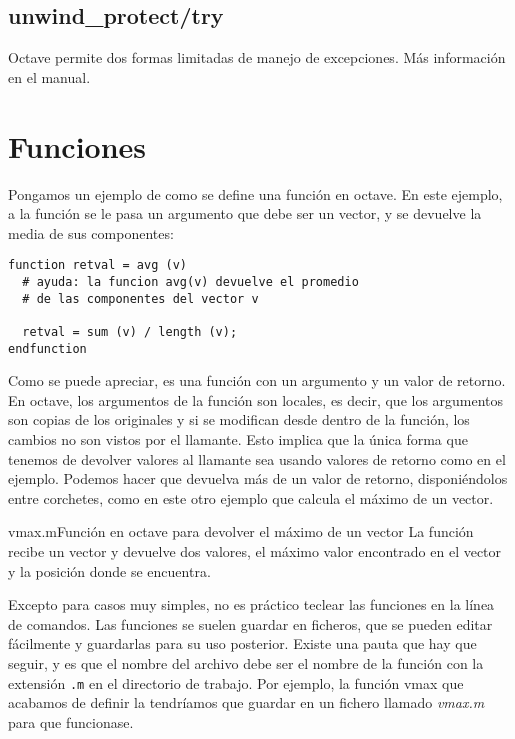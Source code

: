 \subsection{unwind\_protect/try}

Octave  permite  dos formas limitadas de  manejo de  excepciones.  Más
información en el manual.

\section{Funciones}
Pongamos un ejemplo  de como se define una función  en octave. En este
ejemplo, a la función se le pasa  un argumento que debe ser un vector,
y se devuelve la media de sus componentes:

\begin{verbatim}
function retval = avg (v)
  # ayuda: la funcion avg(v) devuelve el promedio
  # de las componentes del vector v

  retval = sum (v) / length (v);
endfunction
\end{verbatim}

Como se puede apreciar, es una función  con un argumento y un valor de
retorno.  En octave,  los argumentos  de  la función  son locales,  es
decir,  que los  argumentos  son  copias de  los  originales  y si  se
modifican desde dentro de la función, los cambios no son vistos por el
llamante.  Esto implica  que la  única forma  que tenemos  de devolver
valores al llamante sea usando valores  de retorno como en el ejemplo.
Podemos hacer que devuelva más  de un valor de retorno, disponiéndolos
entre corchetes, como en este otro ejemplo que calcula el máximo de un
vector.

\begin{ejemplo}{vmax.m}{Función en  octave para devolver el  máximo de
un vector}  La función  recibe un  vector y  devuelve dos  valores, el
máximo valor encontrado en el vector y la posición donde se encuentra.
\end{ejemplo}

Excepto para casos  muy simples, no es práctico  teclear las funciones
en la línea de comandos. Las  funciones se suelen guardar en ficheros,
que se  pueden editar fácilmente  y guardarlas para su  uso posterior.
Existe una pauta  que hay que seguir,  y es que el  nombre del archivo
debe ser  el nombre  de la  función con la  extensión \verb|.m|  en el
directorio de  trabajo. Por ejemplo,  la función vmax que  acabamos de
definir la tendríamos  que guardar en un fichero  llamado {\em vmax.m}
para que funcionase.

